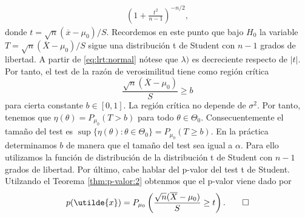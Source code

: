 \begin{ex}
\begin{equation}
\begin{split}
            \left(1 + \frac{t^2}{n-1}\right)^{-n/2},
            \end{split}
            \end{equation}
            donde $t = \sqrt{n}(\overline{x} - \mu_0) / S$. Recordemos en este punto que bajo $H_0$ la variable $T = \sqrt{n}(\overline{X} - \mu_0) / S$ sigue una distribución t de Student con $n-1$ grados de libertad. A partir de \eqref{eq:lrt:normal} nótese que $\lambda)$ es decreciente respecto de $|t|$. Por tanto, el test de la razón de verosimilitud tiene como región crítica
            \[\frac{\sqrt{n}(\overline{X} - \mu_0)}{S} \ge b\]
            para cierta constante $b \in [0,1]$. La región crítica no depende de $\sigma^2$. Por tanto, tenemos que $\eta(\theta) = P_{\mu_0}(T > b)$ para todo $\theta \in \Theta_0$. Consecuentemente el tamaño del test es $\sup\{\eta(\theta): \theta \in \Theta_0\} = P_{\mu_0}(T \ge b)$. En la práctica determinamos $b$ de manera que el tamaño del test sea igual a $\alpha$. Para ello utilizamos la función de distribución de la distribución t de Student con $n-1$ grados de libertad.
            Por último, cabe hablar del p-valor del test t de Student. Utilzando el Teorema \ref{thm:p-valor:2} obtenmos que el p-valor viene dado por
            \[p(\utilde{x}) = P_{\mu_0}\left(\frac{\sqrt{n}(\overline{X} - \mu_0)}{S} \ge t\right). \qedhere\]
        \end{ex}
